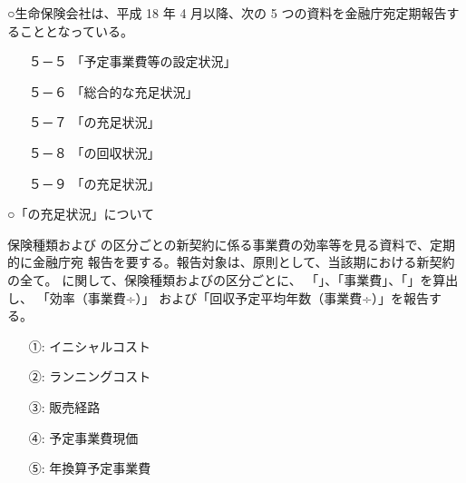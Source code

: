 \documentclass[report,gutter=10mm,fore-edge=10mm,uplatex,dvipdfmx]{jlreq}
\begin{document}
○生命保険会社は、平成 18 年 4 月以降、次の 5 つの資料を金融庁宛定期報告することとなっている。
\begin{itemize}
\item[] ５－５ 「予定事業費等の設定状況」
\item[] ５－６ 「総合的な充足状況」
\item[] ５－７ 「の充足状況」
\item[] ５－８ 「の回収状況」
\item[] ５－９ 「の充足状況」
\end{itemize}

○「の充足状況」について

保険種類および
の区分ごとの新契約に係る事業費の効率等を見る資料で、定期的に金融庁宛
報告を要する。報告対象は、原則として、当該期における新契約の全て。
に関して、保険種類およびの区分ごとに、
「」、「事業費」、「」を算出し、
「効率（事業費÷）」
および「回収予定平均年数（事業費÷）」を報告する。

\answer{}
\begin{itemize}
\item[ ①: ]  イニシャルコスト
\item[ ②: ]  ランニングコスト
\item[ ③: ]  販売経路
\item[ ④: ]  予定事業費現価
\item[ ⑤: ]  年換算予定事業費
\end{itemize}
\end{document}
